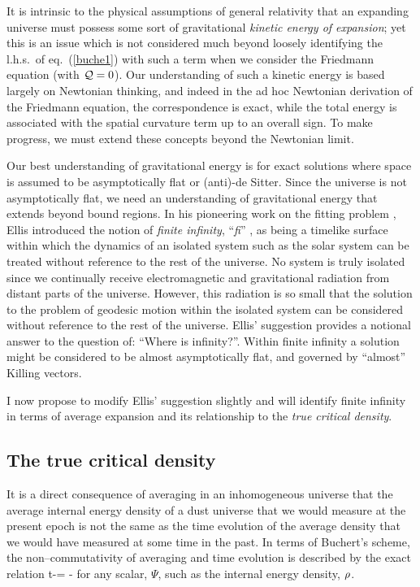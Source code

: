 \documentclass[12pt]{article}
\begin{document}
It is intrinsic to the physical assumptions of general relativity that an
expanding universe must possess some sort of gravitational {\em kinetic
energy of expansion}; yet this is an issue which is not considered much beyond
loosely identifying the l.h.s.\ of eq.~(\ref{buche1}) with such a term when
we consider the Friedmann equation (with $\QQ=0$). Our understanding of such
a kinetic energy is based largely on Newtonian thinking, and indeed in the
ad hoc Newtonian derivation of the Friedmann equation, the correspondence
is exact, while the total energy is associated with the spatial curvature
term up to an overall sign. To make progress, we must extend these concepts
beyond the Newtonian limit.

Our best understanding of gravitational energy is for exact solutions where
space is assumed to be asymptotically flat or (anti)-de Sitter. Since the
universe is not asymptotically flat, we need an understanding of
gravitational energy that extends beyond bound regions. In his pioneering work
on the fitting problem \cite{fit1}, Ellis introduced the notion of
{\em finite infinity}, ``{\em fi}'' ,
as being a timelike surface within which the dynamics of an isolated
system such as the solar system can be treated without reference to the
rest of the universe. No system is truly isolated since we continually
receive electromagnetic and gravitational radiation from distant parts
of the universe. However, this radiation is so small that the solution
to the problem of geodesic motion within the isolated system can be
considered without reference to the rest of the universe. Ellis' suggestion
provides a notional answer to the question of: ``Where is infinity?''.
Within finite infinity a solution might be considered to be almost
asymptotically flat, and governed by ``almost'' Killing vectors.

I now propose to modify Ellis' suggestion slightly and will identify finite
infinity in terms of average expansion and its relationship to the
{\em true critical density}.

\subsection{The true critical density}

It is a direct consequence of averaging in an inhomogeneous universe
that the average internal energy density of a dust universe that we would
measure at the present epoch
is not the same as the time evolution of the average density that we would
have measured at some time in the past. In terms of Buchert's scheme,
the non--commutativity of averaging and time evolution is described by
the exact relation \cite{buch1}
\beq\Deriv{\dd}t{}\ave\Psi-=\ave{\Psi\th}
-\ave\th\ave\Psi\label{comm}\eeq
for any scalar, $\Psi$, such as the internal energy density, $\rho$.
\end{document}

